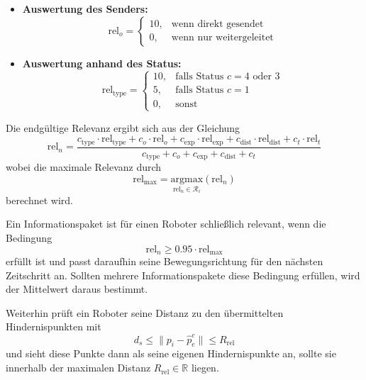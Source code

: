 \documentclass[conference]{IEEEtran}
\begin{document}
\begin{itemize}
    \item \textbf{Auswertung des Senders:}
    \begin{equation}
    \mathrm{rel}_o =
    \begin{cases}
    10, & \text{wenn direkt gesendet}\\
    0, & \text{wenn nur weitergeleitet}
    \end{cases}
    \end{equation}
    
    \item \textbf{Auswertung anhand des Status:}
    \begin{equation}
    \mathrm{rel}_{\mathrm{type}} =
    \begin{cases}
    10, & \text{falls Status } c = 4 \text{ oder } 3 \\
    5,  & \text{falls Status } c = 1 \\
    0,  & \text{sonst}
    \end{cases}
    \end{equation}
\end{itemize}

Die endgültige Relevanz ergibt sich aus der Gleichung
\begin{equation}
\mathrm{rel}_n = \frac{c_{\mathrm{type}} \cdot \mathrm{rel}_{\mathrm{type}} + c_o \cdot \mathrm{rel}_o + c_{\mathrm{exp}} \cdot \mathrm{rel}_{\mathrm{exp}} + c_{\mathrm{dist}} \cdot \mathrm{rel}_{\mathrm{dist}} + c_t \cdot \mathrm{rel}_t}{c_{\mathrm{type}} + c_o + c_{\mathrm{exp}} + c_{\mathrm{dist}} + c_t}
\end{equation}
wobei die maximale Relevanz durch 
\begin{equation}
\mathrm{rel}_{\mathrm{max}} = \underset{\mathrm{rel}_n \in \mathcal{R}_i}{\mathrm{argmax}}(\mathrm{rel}_n)
\end{equation}
berechnet wird.

Ein Informationspaket ist für einen Roboter schließlich relevant, wenn die Bedingung
\begin{equation}
\mathrm{rel}_n \geq 0.95 \cdot \mathrm{rel}_{\mathrm{max}}
\end{equation}
erfüllt ist und passt daraufhin seine 
Bewegungsrichtung für den nächsten Zeitschritt an. Sollten mehrere Informationspakete 
diese Bedingung erfüllen, wird der Mittelwert daraus bestimmt.

Weiterhin prüft ein Roboter seine Distanz zu den übermittelten Hindernispunkten mit 
\begin{equation}
d_s \leq \| p_i - \hat{p}_e^c \| \leq R_{\mathrm{rel}}
\end{equation}
und sieht diese Punkte dann als seine eigenen Hindernispunkte an, sollte 
sie innerhalb der maximalen Distanz \( R_{\mathrm{rel}} \in \mathbb{R} \) liegen.
\end{document}
